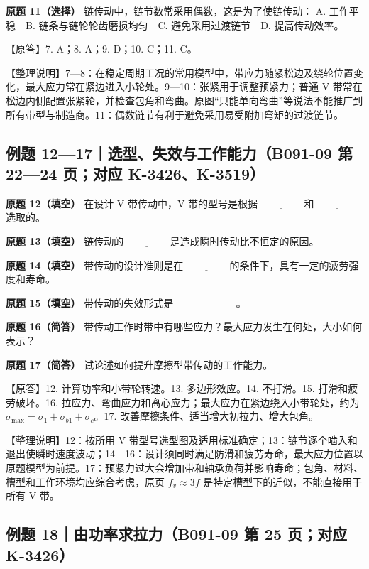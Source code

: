 \documentclass[zihao=5,a4paper,UTF8,fontset=fandol]{ctexart}
\begin{document}
\textbf{原题 11（选择）} 链传动中，链节数常采用偶数，这是为了使链传动：
A. 工作平稳　B. 链条与链轮轮齿磨损均匀　C. 避免采用过渡链节　D. 提高传动效率。


【原答】7. A；8. A；9. D；10. C；11. C。


【整理说明】7—8：在稳定周期工况的常用模型中，带应力随紧松边及绕轮位置变化，最大应力常在紧边进入小轮处。9—10：张紧用于调整预紧力；普通 V 带常在松边内侧配置张紧轮，并检查包角和弯曲。原图“只能单向弯曲”等说法不能推广到所有带型与制造商。11：偶数链节有利于避免采用易受附加弯矩的过渡链节。




\subsection{例题 12—17｜选型、失效与工作能力（B091-09 第 22—24 页；对应 K-3426、K-3519）}

\textbf{原题 12（填空）} 在设计 V 带传动中，V 带的型号是根据 $\underline{\qquad\qquad}$ 和 $\underline{\qquad\qquad}$ 选取的。


\textbf{原题 13（填空）} 链传动的 $\underline{\qquad\qquad}$ 是造成瞬时传动比不恒定的原因。


\textbf{原题 14（填空）} 带传动的设计准则是在 $\underline{\qquad\qquad}$ 的条件下，具有一定的疲劳强度和寿命。


\textbf{原题 15（填空）} 带传动的失效形式是 $\underline{\qquad\qquad\qquad}$。


\textbf{原题 16（简答）} 带传动工作时带中有哪些应力？最大应力发生在何处，大小如何表示？


\textbf{原题 17（简答）} 试论述如何提升摩擦型带传动的工作能力。


【原答】12. 计算功率和小带轮转速。13. 多边形效应。14. 不打滑。15. 打滑和疲劳破坏。16. 拉应力、弯曲应力和离心应力；最大应力在紧边绕入小带轮处，约为 $\sigma_{\max}=\sigma_1+\sigma_{b1}+\sigma_c$。17. 改善摩擦条件、适当增大初拉力、增大包角。


【整理说明】12：按所用 V 带型号选型图及适用标准确定；13：链节逐个啮入和退出使瞬时速度波动；14—16：设计须同时满足防滑和疲劳寿命，最大应力位置以原题模型为前提。17：预紧力过大会增加带和轴承负荷并影响寿命；包角、材料、槽型和工作环境均应综合考虑，原页 $f_v\approx3f$ 是特定槽型下的近似，不能直接用于所有 V 带。


\subsection{例题 18｜由功率求拉力（B091-09 第 25 页；对应 K-3426）}
\end{document}
